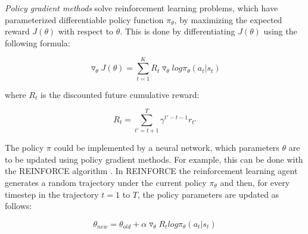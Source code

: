 \textit{Policy gradient methods} solve reinforcement learning problems, which have parameterized differentiable policy function $\pi_{\theta}$, by maximizing the expected reward  $J(\theta)$ with respect to $\theta$. This is done by differentiating $J(\theta)$ using the following formula:

\begin{equation}
    \triangledown_{\theta} J(\theta) = \sum_{t=1}^K R_t \triangledown_{\theta} log \pi_{\theta} (a_t|s_t)
\end{equation}

where $R_t$ is the discounted future cumulative reward:

\begin{equation}
    R_t = \sum^T_{t' = t + 1}\gamma^{t'-t-1}r_{t'}
\end{equation}

The policy $\pi$ could be implemented by a neural network, which parameters $\theta$ are to be updated using policy gradient methods. For example, this can be done with the REINFORCE algorithm \cite{williams1992simple}. In REINFORCE the reinforcement learning agent generates a random trajectory under the current policy $\pi_{\theta}$ and then, for every timestep in the trajectory $t = 1$ to $T$, the policy parameters are updated as follows:

\begin{equation}
    \theta_{new} = \theta_{old} + \alpha \triangledown_{\theta} R_t log \pi_{\theta} (a_t|s_t)   
\end{equation}